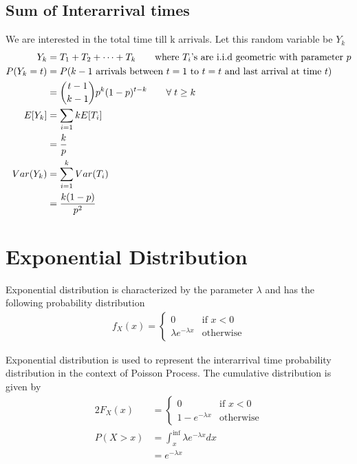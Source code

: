 \documentclass[../probability-notes.tex]{subfiles}
\begin{document}
    \subsection{Sum of Interarrival times}
    We are interested in the total time till k arrivals. Let this random variable be $Y_{k}$
    \begin{align*}
        Y_{k} &= T_{1} + T_{2} + \cdots + T_{k} \tag*{where $T_{i}$'s are i.i.d geometric with parameter $p$}\\
        P(Y_{k} = t) &= P(\text{$k-1$ arrivals between $t=1$ to $t=t$ and last arrival at time $t$})\\
           &= \binom{t-1}{k-1}p^{k}(1-p)^{t-k} \tag*{$\forall\; t \geq k$}\\
        E[Y_{k}] &= \sum_{i=1}{k}E[T_{i}]\\
                &= \frac{k}{p}\\
        Var(Y_{k}) &= \sum_{i=1}^{k}Var(T_{i})\\
                    &= \frac{k(1-p)}{p^{2}}
    \end{align*}


    \section{Exponential Distribution}
    Exponential distribution is characterized by the parameter $\lambda$ and has the following probability distribution
    \begin{align*}
        f_{X}(x) = \begin{cases} 0 &\mbox{if $x < 0$}\\
                                \lambda e^{-\lambda x} &\mbox{otherwise} \end{cases}
    \end{align*}

    Exponential distribution is used to represent the interarrival time probability distribution in the context of Poisson Process. The cumulative distribution is given by
    \begin{alignat*}{2}
        F_{X}(x) &= \begin{cases} 0 &\mbox{if $x < 0$}\\
                                1 - e^{-\lambda x} &\mbox{otherwise} \end{cases}\\
        P(X > x) &= \int_{x}^{\inf} \lambda e^{-\lambda x} dx\\
        &= e^{-\lambda x}
    \end{alignat*}
\end{document}
